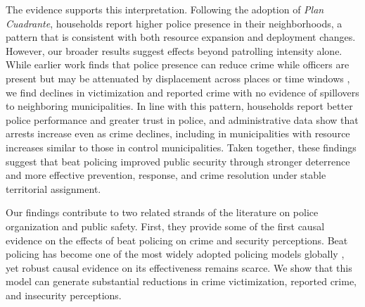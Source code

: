 The evidence supports this interpretation. Following the adoption of \emph{Plan Cuadrante}, households report higher police presence in their neighborhoods, a pattern that is consistent with both resource expansion and deployment changes. However, our broader results suggest effects beyond patrolling intensity alone. While earlier work finds that police presence can reduce crime while officers are present but may be attenuated by displacement across places or time windows \citep{MASTROBUONI2019, Blanes_Mastrobuoni_2018}, we find declines in victimization and reported crime with no evidence of spillovers to neighboring municipalities. In line with this pattern, households report better police performance and greater trust in police, and administrative data show that arrests increase even as crime declines, including in municipalities with resource increases similar to those in control municipalities. Taken together, these findings suggest that beat policing improved public security through stronger deterrence and more effective prevention, response, and crime resolution under stable territorial assignment.

Our findings contribute to two related strands of the literature on police organization and public safety. First, they provide some of the first causal evidence on the effects of beat policing on crime and security perceptions. Beat policing has become one of the most widely adopted policing models globally \citep{NASEM2018,PCSP2014}, yet robust causal evidence on its effectiveness remains scarce. We show that this model can generate substantial reductions in crime victimization, reported crime, and insecurity perceptions.

